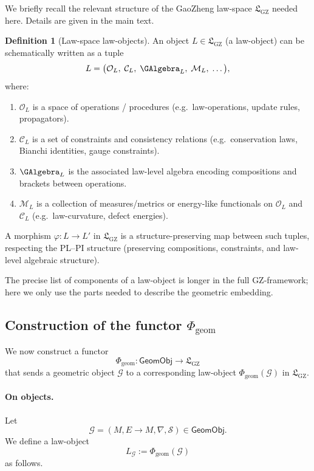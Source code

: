 \documentclass[11pt]{book}
\theoremstyle{plain}
\theoremstyle{definition}
\newtheorem{definition}[theorem]{Definition} \theoremstyle{remark}
\newcommand{\GZLS}{\ensuremath{\mathfrak{L}_{\mathrm{GZ}}}}       \newcommand{\GZLT}{\ensuremath{M_{!w}}}                           \newcommand{\GZLOC}{\ensuremath{A_M}}                             \newcommand{\GZLCurv}{\ensuremath{\mathcal{F}_{\mathrm{law}}}}
\begin{document}
We briefly recall the relevant structure of the GaoZheng law-space
\(\GZLS\) needed here.  Details are given in the main text.

\begin{definition}[Law-space law-objects]
An object \(L\in\GZLS\) (a law-object) can be schematically written as
a tuple
\[
  L
  =
  \bigl(\mathcal{O}_L,\;\mathcal{C}_L,\;
        \GAlgebra_L,\;\mathcal{M}_L,\;\dots\bigr),
\]
where:
\begin{enumerate}
  \item \(\mathcal{O}_L\) is a space of operations / procedures
        (e.g.\ law-operations, update rules, propagators).
  \item \(\mathcal{C}_L\) is a set of constraints and consistency
        relations (e.g.\ conservation laws, Bianchi identities,
        gauge constraints).
  \item \(\GAlgebra_L\) is the associated law-level algebra encoding
        compositions and brackets between operations.
  \item \(\mathcal{M}_L\) is a collection of measures/metrics or
        energy-like functionals on \(\mathcal{O}_L\) and \(\mathcal{C}_L\)
        (e.g.\ law-curvature, defect energies).
\end{enumerate}
A morphism \(\varphi:L\to L'\) in \(\GZLS\) is a structure-preserving
map between such tuples, respecting the PL--PI structure (preserving
compositions, constraints, and law-level algebraic structure).
\end{definition}

The precise list of components of a law-object is longer in the full
GZ-framework; here we only use the parts needed to describe the
geometric embedding.



\subsection*{Construction of the functor \texorpdfstring{$\Phi_{\mathrm{geom}}$}{Phi\_geom}}


We now construct a functor
\[
  \Phi_{\mathrm{geom}}:\mathsf{GeomObj}\longrightarrow\GZLS
\]
that sends a geometric object \(\mathcal{G}\) to a corresponding
law-object \(\Phi_{\mathrm{geom}}(\mathcal{G})\) in \(\GZLS\).

\paragraph{On objects.}
Let
\[
  \mathcal{G}=(M,E\to M,\nabla,\mathcal{S})\in\mathsf{GeomObj}.
\]
We define a law-object
\[
  L_{\mathcal{G}}
  := \Phi_{\mathrm{geom}}(\mathcal{G})
\]
as follows.
\end{document}
